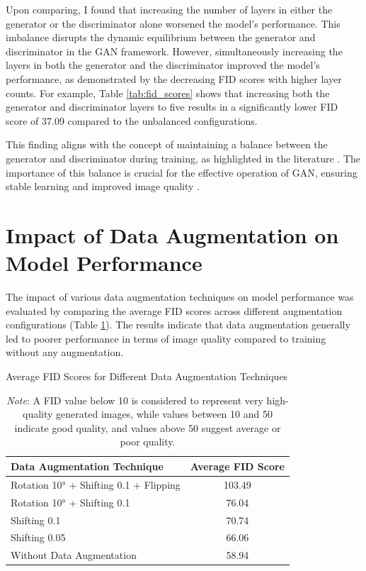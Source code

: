 Upon comparing, I found that increasing the number of layers in either the generator or the discriminator alone worsened the model’s performance. This imbalance disrupts the dynamic equilibrium between the generator and discriminator in the GAN framework. However, simultaneously increasing the layers in both the generator and the discriminator improved the model’s performance, as demonstrated by the decreasing FID scores with higher layer counts. For example, Table \ref{tab:fid_scores} shows that increasing both the generator and discriminator layers to five results in a significantly lower FID score of 37.09 compared to the unbalanced configurations.

This finding aligns with the concept of maintaining a balance between the generator and discriminator during training, as highlighted in the literature \citep{10.48550/arxiv.1703.10717}. The importance of this balance is crucial for the effective operation of GAN, ensuring stable learning and improved image quality \citep{10.48550/arxiv.2002.02112}.    
\section{Impact of Data Augmentation on Model Performance}

The impact of various data augmentation techniques on model performance was evaluated by comparing the average FID scores across different augmentation configurations (Table \ref{tab:augmented_training_average}). The results indicate that data augmentation generally led to poorer performance in terms of image quality compared to training without any augmentation.

\begin{table}[H]
    \centering
    \caption{Average FID Scores for Different Data Augmentation Techniques}
    \begin{tabular}{|l|c|}
    \hline
    \textbf{Data Augmentation Technique} & \textbf{Average FID Score} \\ \hline
    Rotation 10° + Shifting 0.1 + Flipping & 103.49 \\ \hline
    Rotation 10° + Shifting 0.1 & 76.04 \\ \hline
    Shifting 0.1 & 70.74 \\ \hline
    Shifting 0.05 & 66.06 \\ \hline
    \rowcolor{green!25} Without Data Augmentation & 58.94 \\ \hline
    \end{tabular}
    \label{tab:augmented_training_average}
    \vspace{2mm}
    \caption*{\textit{Note}: A FID value below 10 is considered to represent very high-quality generated images, 
    while values between 10 and 50 indicate good quality, and values above 50 suggest average or poor quality.}
\end{table}

